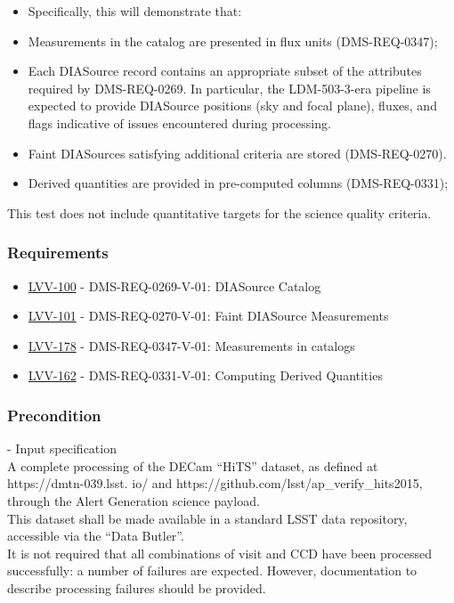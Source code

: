 \begin{itemize}
\tightlist
\item
  Specifically, this will demonstrate that:
\item
  Measurements in the catalog are presented in flux units
  (DMS-REQ-0347);
\item
  Each DIASource record contains an appropriate subset of the attributes
  required by DMS-REQ-0269. In particular, the LDM-503-3-era pipeline is
  expected to provide DIASource positions (sky and focal plane), fluxes,
  and flags indicative of issues encountered during processing.
\item
  Faint DIASources satisfying additional criteria are stored
  (DMS-REQ-0270).
\item
  Derived quantities are provided in pre-computed columns
  (DMS-REQ-0331);
\end{itemize}

This test does not include quantitative targets for the science quality
criteria.\\[2\baselineskip]

\subsubsection{Requirements}\label{requirements-4}

\begin{itemize}
\tightlist
\item
  \href{https://jira.lsstcorp.org/browse/LVV-100}{LVV-100} -
  DMS-REQ-0269-V-01: DIASource Catalog
\item
  \href{https://jira.lsstcorp.org/browse/LVV-101}{LVV-101} -
  DMS-REQ-0270-V-01: Faint DIASource Measurements
\item
  \href{https://jira.lsstcorp.org/browse/LVV-178}{LVV-178} -
  DMS-REQ-0347-V-01: Measurements in catalogs
\item
  \href{https://jira.lsstcorp.org/browse/LVV-162}{LVV-162} -
  DMS-REQ-0331-V-01: Computing Derived Quantities
\end{itemize}

\subsubsection{Precondition}\label{precondition-4}

- Input specification\\[2\baselineskip]A complete processing of the
DECam ``HiTS'' dataset, as defined at https://dmtn-039.lsst. io/ and
https://github.com/lsst/ap\_verify\_hits2015, through the Alert
Generation science payload.\\
This dataset shall be made available in a standard LSST data repository,
accessible via the ``Data Butler''.\\
It is not required that all combinations of visit and CCD have been
processed successfully: a number of failures are expected. However,
documentation to describe processing failures should be provided.

